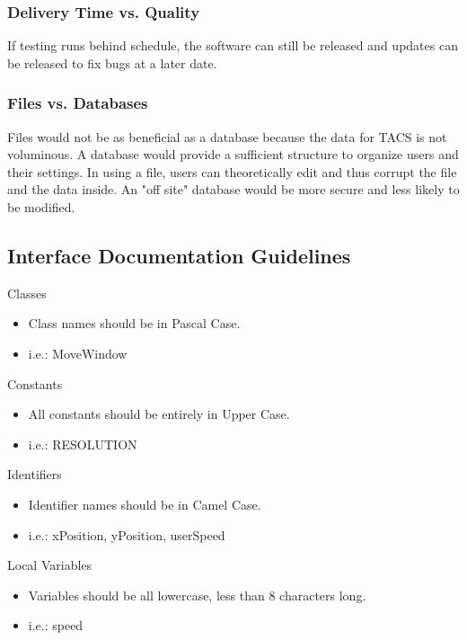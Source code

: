 \documentclass[titlepage]{article}
\begin{document}
\subsubsection{Delivery Time vs. Quality}
\item If testing runs behind schedule, the software can still be released and updates can be released to fix bugs at a later date.

\subsubsection{Files vs. Databases}
\item Files would not be as beneficial as a database because the data for TACS is not voluminous. A database would provide a sufficient structure to organize users and their settings. In using a file, users can theoretically edit and thus corrupt the file and the data inside. An "off site" database would be more secure and less likely to be modified.

\subsection{Interface Documentation Guidelines}
Classes
\begin{itemize}
\item Class names should be in Pascal Case.
\item i.e.: MoveWindow
\end{itemize}
Constants
\begin{itemize}
\item All constants should be entirely in Upper Case.
\item i.e.: RESOLUTION
\end{itemize}
Identifiers
\begin{itemize}
\item Identifier names should be in Camel Case.
\item i.e.: xPosition, yPosition, userSpeed
\end{itemize}
Local Variables
\begin{itemize}
\item Variables should be all lowercase, less than 8 characters long.
\item i.e.: speed
\end{itemize}
\end{document}

